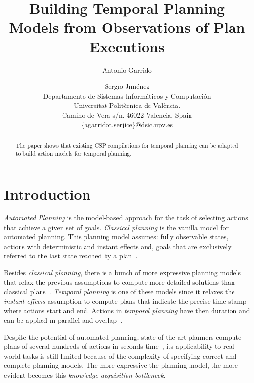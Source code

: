 \documentclass[letterpaper]{article} %
\begin{document}
\title{Building Temporal Planning Models from Observations of Plan Executions}

\author{Antonio Garrido\and Sergio Jim\'enez\\
{\small Departamento de Sistemas Inform\'aticos y Computaci\'on}\\
{\small Universitat Polit\`ecnica de Val\`encia.}\\
{\small Camino de Vera s/n. 46022 Valencia, Spain}\\
{\small \{agarridot,serjice\}@dsic.upv.es}}



\maketitle
\begin{abstract}
The paper shows that existing CSP compilations for temporal planning can be adapted to build action models for temporal planning.
\end{abstract}


\section{Introduction}
\label{sec:introduction}
{\em Automated Planning} is the model-based approach for the task of selecting actions that achieve a given set of goals. {\em Classical planning} is the vanilla model for automated planning. This planning model assumes: fully observable states, actions with deterministic and instant effects and, goals that are exclusively referred to the last state reached by a plan~\cite{geffner2013concise}.

Besides {\em classical planning}, there is a bunch of more expressive planning models that relax the previous assumptions to compute more detailed solutions than classical plans~\cite{ghallab2004automated}. {\em Temporal planning} is one of these models since it relaxes the {\em instant effects} assumption to compute plans that indicate the precise time-stamp where actions start and end. Actions in {\em temporal planning} have then duration and can be applied in parallel and overlap~\cite{cushing2007temporal}.

Despite the potential of automated planning, state-of-the-art planners compute plans of several hundreds of actions in seconds time~\cite{vallati20152014}, its applicability to real-world tasks is still limited because of the complexity of specifying correct and complete planning models. The more expressive the planning model, the more evident becomes this {\em knowledge acquisition bottleneck}.
\end{document}
